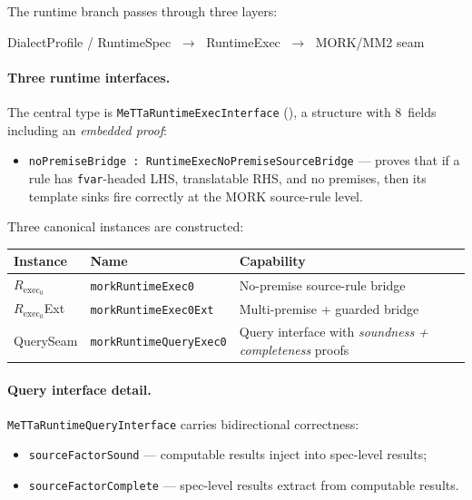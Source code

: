 \documentclass[11pt]{article}
\theoremstyle{remark}
\newcommand{\MORK}{\textup{MORK}}
\newcommand{\code}[1]{\texttt{#1}}
\newcommand{\codepath}[1]{\path{#1}}
\newcommand{\leanref}[1]{\texttt{#1}}
\begin{document}
The runtime branch passes through three layers:

\begin{center}
DialectProfile / RuntimeSpec $\;\to\;$ RuntimeExec $\;\to\;$ \MORK{}/MM2 seam
\end{center}

\paragraph{Three runtime interfaces.}
The central type is \leanref{MeTTaRuntimeExecInterface}
(\codepath{RuntimeExec.lean}), a structure with 8~fields including an
\emph{embedded proof}:

\begin{itemize}[nosep]
  \item \leanref{noPremiseBridge : RuntimeExecNoPremiseSourceBridge} ---
  proves that if a rule has \code{fvar}-headed LHS, translatable RHS, and
  no premises, then its template sinks fire correctly at the
  \MORK{} source-rule level.
\end{itemize}

Three canonical instances are constructed:

\begin{center}
\begin{tabular}{@{}llp{5.5cm}@{}}
\toprule
Instance & Name & Capability \\
\midrule
$R_{\mathrm{exec}_0}$ & \leanref{morkRuntimeExec0} &
  No-premise source-rule bridge \\
$R_{\mathrm{exec}_0}$Ext & \leanref{morkRuntimeExec0Ext} &
  Multi-premise + guarded bridge \\
QuerySeam & \leanref{morkRuntimeQueryExec0} &
  Query interface with \emph{soundness + completeness} proofs \\
\bottomrule
\end{tabular}
\end{center}

\paragraph{Query interface detail.}
\leanref{MeTTaRuntimeQueryInterface}
carries bidirectional correctness:
\begin{itemize}[nosep]
  \item \leanref{sourceFactorSound} --- computable results inject into
  spec-level results;
  \item \leanref{sourceFactorComplete} --- spec-level results extract from
  computable results.
\end{itemize}
\end{document}
